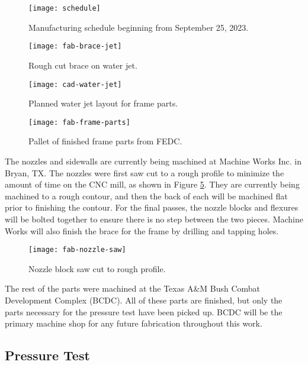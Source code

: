 \begin{figure}[ht!]
    \centering
    \texttt{[image: schedule]}
    \caption{Manufacturing schedule beginning from September 25, 2023.}
    \label{fig:schedule}
\end{figure}

\begin{figure}[ht!]
    \centering
    \texttt{[image: fab-brace-jet]}
    \caption{Rough cut brace on water jet.}
    \label{fig:fab-brace-jet}
\end{figure}

\begin{figure}[ht!]
    \centering
    \texttt{[image: cad-water-jet]}
    \caption{Planned water jet layout for frame parts.}
    \label{fig:cad-water-jet}
\end{figure}

\begin{figure}[ht!]
    \centering
    \texttt{[image: fab-frame-parts]}
    \caption{Pallet of finished frame parts from FEDC.}
    \label{fig:fab-frame-parts}
\end{figure}

The nozzles and sidewalls are currently being machined at Machine Works Inc. in Bryan, TX. The nozzles were first saw cut to a rough profile to minimize the amount of time on the CNC mill, as shown in Figure \ref{fig:fab-nozzle-saw}. They are currently being machined to a rough contour, and then the back of each will be machined flat prior to finishing the contour. For the final passes, the nozzle blocks and flexures will be bolted together to ensure there is no step between the two pieces. Machine Works will also finish the brace for the frame by drilling and tapping holes.

\begin{figure}[ht!]
    \centering
    \texttt{[image: fab-nozzle-saw]}
    \caption{Nozzle block saw cut to rough profile.}
    \label{fig:fab-nozzle-saw}
\end{figure}

The rest of the parts were machined at the Texas A\&M Bush Combat Development Complex (BCDC). All of these parts are finished, but only the parts necessary for the pressure test have been picked up. BCDC will be the primary machine shop for any future fabrication throughout this work.

\subsection{Pressure Test}

